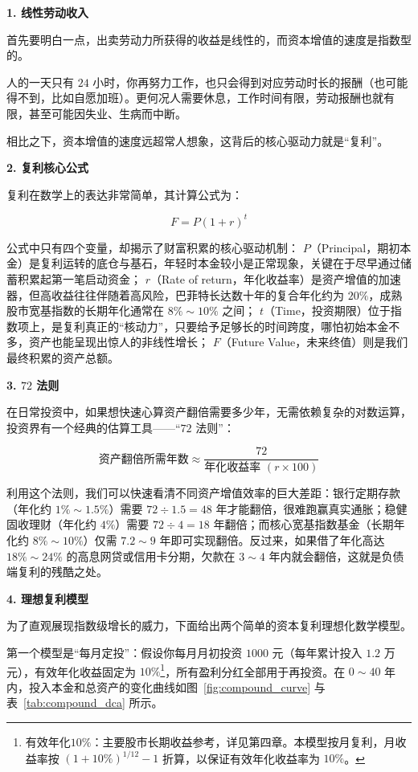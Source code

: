\documentclass[12pt,openany]{book}
\newcommand{\subhead}[1]{%
    \par\vspace{0.5\baselineskip}%
    \noindent\textbf{#1}\par%
    \vspace{0.5\baselineskip}%
}
\begin{document}
\subhead{1. 线性劳动收入}

首先要明白一点，出卖劳动力所获得的收益是线性的，而资本增值的速度是指数型的。

人的一天只有 $24$ 小时，你再努力工作，也只会得到对应劳动时长的报酬（也可能得不到，比如自愿加班）。更何况人需要休息，工作时间有限，劳动报酬也就有限，甚至可能因失业、生病而中断。

相比之下，资本增值的速度远超常人想象，这背后的核心驱动力就是“复利”。

\subhead{2. 复利核心公式}

复利在数学上的表达非常简单，其计算公式为：

\[
F = P(1 + r)^t
\]

公式中只有四个变量，却揭示了财富积累的核心驱动机制：
$P$（Principal，期初本金）是复利运转的底仓与基石，年轻时本金较小是正常现象，关键在于尽早通过储蓄积累起第一笔启动资金；
$r$（Rate of return，年化收益率）是资产增值的加速器，但高收益往往伴随着高风险，巴菲特长达数十年的复合年化约为 $20\%$，成熟股市宽基指数的长期年化通常在 $8\%\sim 10\%$ 之间；
$t$（Time，投资期限）位于指数项上，是复利真正的“核动力”，只要给予足够长的时间跨度，哪怕初始本金不多，资产也能呈现出惊人的非线性增长；
$F$（Future Value，未来终值）则是我们最终积累的资产总额。

\subhead{3. $72$ 法则}

在日常投资中，如果想快速心算资产翻倍需要多少年，无需依赖复杂的对数运算，投资界有一个经典的估算工具——“$72$ 法则”：

\[
\text{资产翻倍所需年数} \approx \frac{72}{\text{年化收益率 } (r \times 100)}
\]

利用这个法则，我们可以快速看清不同资产增值效率的巨大差距：银行定期存款（年化约 $1\% \sim 1.5\%$）需要 $72 \div 1.5 = 48$ 年才能翻倍，很难跑赢真实通胀；稳健固收理财（年化约 $4\%$）需要 $72 \div 4 = 18$ 年翻倍；而核心宽基指数基金（长期年化约 $8\%\sim 10\%$）仅需 $7.2\sim 9$ 年即可实现翻倍。反过来，如果借了年化高达 $18\%\sim 24\%$ 的高息网贷或信用卡分期，欠款在 $3\sim 4$ 年内就会翻倍，这就是负债端复利的残酷之处。

\newpage

\subhead{4. 理想复利模型}

为了直观展现指数级增长的威力，下面给出两个简单的资本复利理想化数学模型。

第一个模型是“每月定投”：假设你每月月初投资 $1000$ 元（每年累计投入 $1.2$ 万元），有效年化收益固定为 $10\%$\footnote{有效年化$10\%$：主要股市长期收益参考，详见第四章。本模型按月复利，月收益率按 $(1+10\%)^{1/12}-1$ 折算，以保证有效年化收益率为 $10\%$。}，所有盈利分红全部用于再投资。在 $0\sim 40$ 年内，投入本金和总资产的变化曲线如图~\ref{fig:compound_curve} 与表~\ref{tab:compound_dca} 所示。
\end{document}
